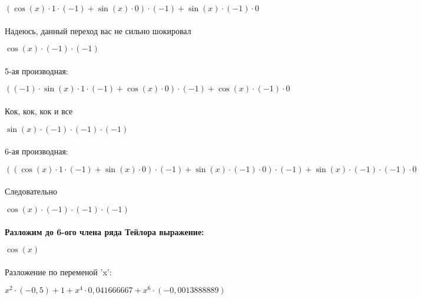 \documentclass[a4paper, 12pt] {article}
\begin{document}
\begin{math}
( \cos (x) \cdot 1 \cdot (-1)+ \sin (x) \cdot 0) \cdot (-1)+ \sin (x) \cdot (-1) \cdot 0
\end{math}
\\ 
\\ 
Надеюсь, данный переход вас не сильно шокировал

\begin{math}
 \cos (x) \cdot (-1) \cdot (-1)
\end{math}
\\ 
\\ 
5-ая производная:

\begin{math}
((-1) \cdot  \sin (x) \cdot 1 \cdot (-1)+ \cos (x) \cdot 0) \cdot (-1)+ \cos (x) \cdot (-1) \cdot 0
\end{math}
\\ 
\\ 
Кок, кок, кок и все

\begin{math}
 \sin (x) \cdot (-1) \cdot (-1) \cdot (-1)
\end{math}
\\ 
\\ 
6-ая производная:

\begin{math}
(( \cos (x) \cdot 1 \cdot (-1)+ \sin (x) \cdot 0) \cdot (-1)+ \sin (x) \cdot (-1) \cdot 0) \cdot (-1)+ \sin (x) \cdot (-1) \cdot (-1) \cdot 0
\end{math}
\\ 
\\ 
Следовательно

\begin{math}
 \cos (x) \cdot (-1) \cdot (-1) \cdot (-1)
\end{math}
\\ 
\\ 
\textbf{Разложим до 6-ого члена ряда Тейлора выражение:}

\begin{math}
 \cos (x)
\end{math}
\\ 
\\ 
Разложение по переменой 'x':

\begin{math}
x^{2} \cdot (-0,5)+1+x^{4} \cdot 0,041666667+x^{6} \cdot (-0,0013888889)
\end{math}
\\ 
\\ 
\end{document}
